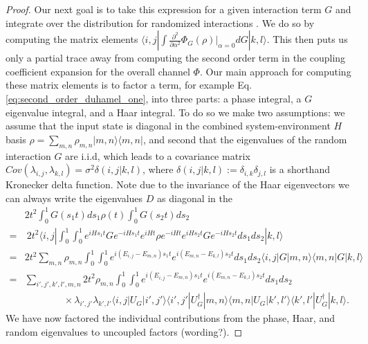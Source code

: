 \documentclass{article}
\newcommand{\ket}[1]{|#1\rangle}
\newcommand{\bra}[1]{\langle #1|}
\newcommand{\ketbra}[2]{| #1\rangle\! \langle #2|}
\begin{document}
\begin{proof}
Our next goal is to take this expression for a given interaction term $G$ and integrate over the distribution for randomized interactions .
We do so by computing the matrix elements $\bra{i,j} \int \frac{\partial^2}{\partial \alpha^2} \Phi_G(\rho) \big|_{\alpha = 0} dG \ket{k,l}$. This then puts us only a partial trace away from computing the second order term in the coupling coefficient expansion for the overall channel $\Phi$. Our main approach for computing these matrix elements is to factor a term, for example Eq. \eqref{eq:second_order_duhamel_one}, into three parts: a phase integral, a $G$ eigenvalue integral, and a Haar integral. To do so we make two assumptions: we assume that the input state is diagonal in the combined system-environment $H$ basis $\rho = \sum_{m,n} \rho_{m,n} \ketbra{m,n}{m,n}$, and second that the eigenvalues of the random interaction $G$ are i.i.d, which leads to a covariance matrix $Cov(\lambda_{i,j}, \lambda_{k,l}) = \sigma^2 \delta(i,j | k,l)$, where $\delta(i,j | k,l) := \delta_{i,k} \delta_{j,l}$ is a shorthand Kronecker delta function. Note due to the invariance of the Haar eigenvectors we can always write the eigenvalues $D$ as diagonal in the 
\begin{align}
    &2t^2 \int_0^1 G(s_1t) ds_1 \rho(t) \int_0^1 G(s_2 t) ds_2 \\
    =&~ 2 t^2 \bra{i,j} \int_{0}^1 \int_0^1 e^{i H s_1 t} G e^{-iH s_1 t} e^{i H t} \rho e^{-i H t} e^{i H s_2 t} G e^{-iH s_2 t} ds_1 ds_2 \ket{k,l} \\
    =& 2 t^2 \sum_{m,n} \rho_{m,n} \int_0^1 \int_0^1 e^{i(E_{i,j} - E_{m,n})s_1 t} e^{i(E_{m,n} - E_{k,l}) s_2 t} ds_1 ds_2 \bra{i,j}G \ketbra{m,n}{m,n} G \ket{k,l} \\
    =& \sum_{i',j',k',l',m,n} 2t^2 \rho_{m,n} \int_0^1 \int_0^1 e^{i(E_{i,j} - E_{m,n})s_1 t} e^{i(E_{m,n} - E_{k,l}) s_2 t} ds_1 ds_2 \nonumber \\
     &\quad \quad \quad \quad \times \lambda_{i',j'} \lambda_{k',l'} \bra{i,j} U_G \ket{i',j'} \bra{i',j'} U_G^\dagger \ket{m,n} \bra{m,n} U_G \ket{k',l'} \bra{k',l'} U_G^\dagger \ket{k,l}.
\end{align}
We have now factored the individual contributions from the phase, Haar, and random eigenvalues to uncoupled factors (wording?). 


\end{proof}
\end{document}
